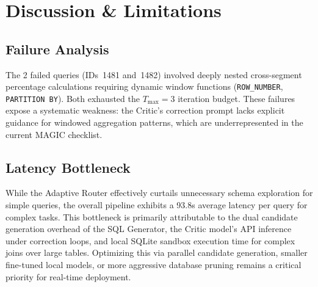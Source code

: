\section{Discussion \& Limitations}
\label{sec:discussion}

\subsection{Failure Analysis}
The 2 failed queries (IDs~1481 and~1482) involved deeply nested cross-segment percentage calculations requiring dynamic window functions (\texttt{ROW\_NUMBER}, \texttt{PARTITION BY}). Both exhausted the $T_{\max} = 3$ iteration budget. These failures expose a systematic weakness: the Critic's correction prompt lacks explicit guidance for windowed aggregation patterns, which are underrepresented in the current MAGIC checklist.

\subsection{Latency Bottleneck}
While the Adaptive Router effectively curtails unnecessary schema exploration for simple queries, the overall pipeline exhibits a 93.8s average latency per query for complex tasks. This bottleneck is primarily attributable to the dual candidate generation overhead of the SQL Generator, the Critic model's API inference under correction loops, and local SQLite sandbox execution time for complex joins over large tables. Optimizing this via parallel candidate generation, smaller fine-tuned local models, or more aggressive database pruning remains a critical priority for real-time deployment.
